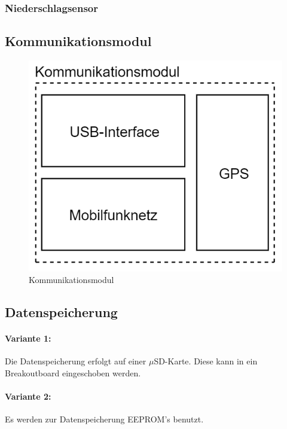 \subsubsection{Niederschlagsensor}

\subsection{Kommunikationsmodul}
\begin{figure}[h]
\centering
\includegraphics[scale=0.7]{graphics/Kommunikationsmodul.PNG}
\caption{Kommunikationsmodul}
\end{figure}
\newpage
\subsection{Datenspeicherung}
\paragraph{Variante 1:}

Die Datenspeicherung erfolgt auf einer $\mu$SD-Karte. Diese kann in ein Breakoutboard eingeschoben werden.\\

\paragraph{Variante 2:}

Es werden zur Datenspeicherung EEPROM's benutzt.\\

